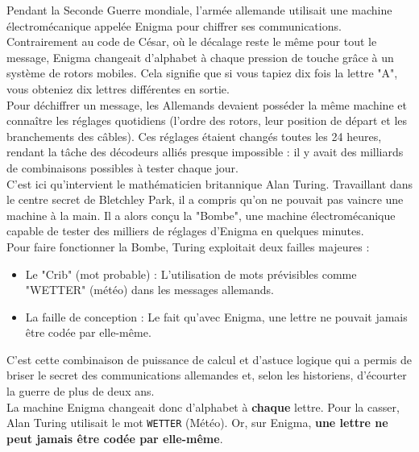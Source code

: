 \newpage
\begin{Exercise}[title={Le défi de la machine Enigma et le génie de Bletchley Park}]

Pendant la Seconde Guerre mondiale, l'armée allemande utilisait une machine électromécanique appelée Enigma pour chiffrer ses communications. Contrairement au code de César, où le décalage reste le même pour tout le message, Enigma changeait d'alphabet à chaque pression de touche grâce à un système de rotors mobiles. Cela signifie que si vous tapiez dix fois la lettre "A", vous obteniez dix lettres différentes en sortie.\\

Pour déchiffrer un message, les Allemands devaient posséder la même machine et connaître les réglages quotidiens (l'ordre des rotors, leur position de départ et les branchements des câbles). Ces réglages étaient changés toutes les 24 heures, rendant la tâche des décodeurs alliés presque impossible : il y avait des milliards de combinaisons possibles à tester chaque jour.\\

C’est ici qu’intervient le mathématicien britannique Alan Turing. Travaillant dans le centre secret de Bletchley Park, il a compris qu'on ne pouvait pas vaincre une machine à la main. Il a alors conçu la "Bombe", une machine électromécanique capable de tester des milliers de réglages d'Enigma en quelques minutes.\\

Pour faire fonctionner la Bombe, Turing exploitait deux failles majeures :
\begin{itemize}
\item Le "Crib" (mot probable) : L'utilisation de mots prévisibles comme "WETTER" (météo) dans les messages allemands.
\item La faille de conception : Le fait qu'avec Enigma, une lettre ne pouvait jamais être codée par elle-même.
\end{itemize}
C'est cette combinaison de puissance de calcul et d'astuce logique qui a permis de briser le secret des communications allemandes et, selon les historiens, d'écourter la guerre de plus de deux ans.\\

La machine Enigma changeait donc d'alphabet à \textbf{chaque} lettre. Pour la casser, Alan Turing utilisait le mot \texttt{WETTER} (Météo). Or, sur Enigma, \textbf{une lettre ne peut jamais être codée par elle-même}.\\


\end{Exercise}
